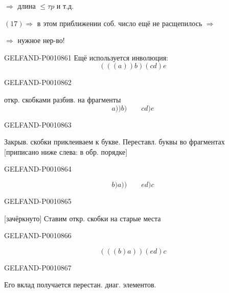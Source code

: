 $\Rightarrow$ длина $\le\tau p$ и т.д.

$(17)\Rightarrow$ в этом приближении соб. число ещё не расщепилось $\Rightarrow$

$\Rightarrow$ нужное нер-во!


\begin{GelfandAdjacentEvidence}{GELFAND-P001086}{1}
Ещё используется инволюция:
\[
(((a))b)(cd)e
\]
\end{GelfandAdjacentEvidence}
\begin{GelfandAdjacentEvidence}{GELFAND-P001086}{2}


откр. скобками разбив. на фрагменты
\[
a))b)\qquad cd)e
\]
\end{GelfandAdjacentEvidence}
\begin{GelfandAdjacentEvidence}{GELFAND-P001086}{3}


Закрыв. скобки приклеиваем к букве. Переставл. буквы во фрагментах
[приписано ниже слева: в обр. порядке]
\end{GelfandAdjacentEvidence}
\begin{GelfandAdjacentEvidence}{GELFAND-P001086}{4}

\[
b)a))\qquad ed)c
\]
\end{GelfandAdjacentEvidence}
\begin{GelfandAdjacentEvidence}{GELFAND-P001086}{5}


[зачёркнуто] Ставим откр. скобки на старые места
\end{GelfandAdjacentEvidence}
\begin{GelfandAdjacentEvidence}{GELFAND-P001086}{6}

\[
(((b)a))(ed)c
\]
\end{GelfandAdjacentEvidence}
\begin{GelfandAdjacentEvidence}{GELFAND-P001086}{7}



Его вклад получается перестан. диаг. элементов.
\end{GelfandAdjacentEvidence}



